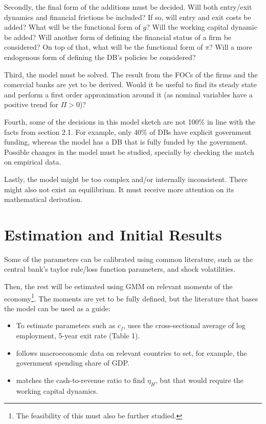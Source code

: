 \documentclass[12pt]{article}
\begin{document}
Secondly, the final form of the additions must be decided. Will both entry/exit dynamics and financial frictions be included? If so, will entry and exit costs be added? What will be the functional form of $g$? Will the working capital dynamic be added? Will another form of defining the financial status of a firm be considered? On top of that, what will be the functional form of $\pi$? Will a more endogenous form of defining the DB's policies be considered?

Third, the model must be solved. The result from the FOCs of the firms and the comercial banks are yet to be derived. Would it be useful to find its steady state and perform a first order approximation around it (as nominal variables have a positive trend for $\Pi > 0$)?

Fourth, some of the decisions in this model sketch are not 100\% in line with the facts from section 2.1. For example, only 40\% of DBs have explicit government funding, whereas the model has a DB that is fully funded by the government. Possible changes in the model must be studied, specially by checking the match on empirical data.

Lastly, the model might be too complex and/or internally inconsistent. There might also not exist an equilibrium. It must receive more attention on its mathematical derivation.



\section{Estimation and Initial Results}

Some of the parameters can be calibrated using common literature, such as the central bank's taylor rule/loss function parameters, and shock volatilities.

Then, the rest will be estimated using GMM on relevant moments of the economy\footnote{The feasibility of this must also be further studied.}. The moments are yet to be fully defined, but the literature that bases the model can be used as a guide:

\begin{itemize}
    \item To estimate parameters such as $c_f$, \cite{hopenhayn_1993} uses the cross-sectional average of log employment, 5-year exit rate (Table 1).
    \item \cite{ellison_2014} follows macroeconomic data on relevant countries to set, for example, the government spending share of GDP.
    \item \cite{alfaro_2024} matches the cash-to-revenue ratio to find $\eta_H$, but that would require the working capital dynamics.
\end{itemize}
\end{document}
